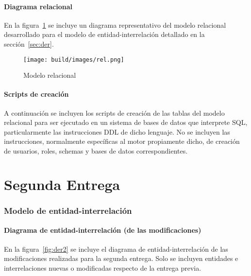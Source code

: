 \documentclass[a4paper,11pt]{article}
\begin{document}
\subsection{Diagrama relacional}

En la figura~\ref{fig:relacional} se incluye un diagrama representativo del
modelo relacional desarrollado para el modelo de entidad-interrelación
detallado en la sección~\ref{sec:der}.

\begin{figure}[h!t]
  \centering
  \texttt{[image: build/images/rel.png]}
  \caption{Modelo relacional} \label{fig:relacional}
\end{figure}

\FloatBarrier

\subsection{Scripts de creación}

A continuación se incluyen los scripts de creación de las tablas del modelo
relacional para ser ejecutado en un sistema de bases de datos que interprete
SQL, particularmente las instrucciones DDL de dicho lenguaje. No se incluyen
las instrucciones, normalmente específicas al motor propiamente dicho, de
creación de usuarios, roles, schemas y bases de datos correspondientes.



\clearpage

\part{Segunda Entrega}

\section{Modelo de entidad-interrelación} \label{sec:der2}

\subsection{Diagrama de entidad-interrelación (de las modificaciones)}

En la figura~\ref{fig:der2} se incluye el diagrama de entidad-interrelación de
las modificaciones realizadas para la segunda entrega. Solo se incluyen
entidades e interrelaciones nuevas o modificadas respecto de la entrega previa.
\end{document}
